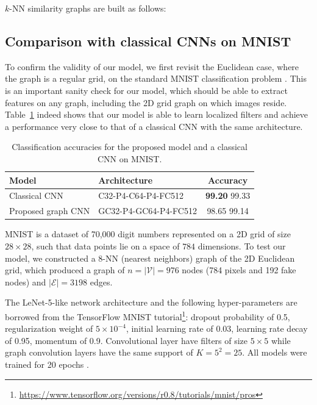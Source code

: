 \documentclass{article}
\newcommand{\V}{\mathcal{V}}
\newcommand{\E}{\mathcal{E}}
\newcommand{\tabref}[1]{Table~\ref{tab:#1}}
\newcommand{\todo}[1]{{\color{red} #1 }}
\begin{document}
\todo{$k$-NN similarity graphs are built as follows: }

\subsection{Comparison with classical CNNs on MNIST}

To confirm the validity of our model, we first revisit the Euclidean
case, where the graph is a regular grid, on the standard MNIST classification
problem \cite{pro:LeCunBottouBengioHaffner98MNIST}.
This is an important sanity check for our model, which should be able to extract
features on any graph, including the 2D grid graph on which images reside.
\tabref{mnist} indeed shows that our model is able to learn localized filters
and achieve a performance very close to that of a classical CNN with the same
architecture.

\begin{table}[h!]
\centering
\begin{tabular}{llc}
\toprule
Model & Architecture & Accuracy \\
\midrule
Classical CNN & C32-P4-C64-P4-FC512 & \textbf{99.20} \todo{99.33} \\
Proposed graph CNN & GC32-P4-GC64-P4-FC512 & 98.65 \todo{99.14} \\
\bottomrule
\end{tabular}
\caption{Classification accuracies for the proposed model and a classical CNN on
MNIST.} 
\label{tab:mnist}
\end{table}

MNIST is a dataset of 70,000 digit numbers represented on a 2D grid of size $28
\times 28$, such that data points lie on a space of $784$ dimensions. To test
our model, we constructed a 8-NN (nearest neighbors) graph of the 2D Euclidean
grid, which produced a graph of $n = |\V| = 976$ nodes (784 pixels and 192 fake
nodes) and $|\E| = 3198$ edges.

The LeNet-5-like network architecture and the following hyper-parameters are
borrowed from the TensorFlow MNIST tutorial\footnote{
\url{https://www.tensorflow.org/versions/r0.8/tutorials/mnist/pros}}: dropout
probability of 0.5, regularization weight of $5\times10^{-4}$, initial learning
rate of 0.03, learning rate decay of 0.95, momentum of 0.9. Convolutional layer
have filters of size $5 \times 5$ while graph convolution layers have the same
support of $K = 5^2 = 25$. All models were trained for \todo{20 epochs}.
\end{document}
